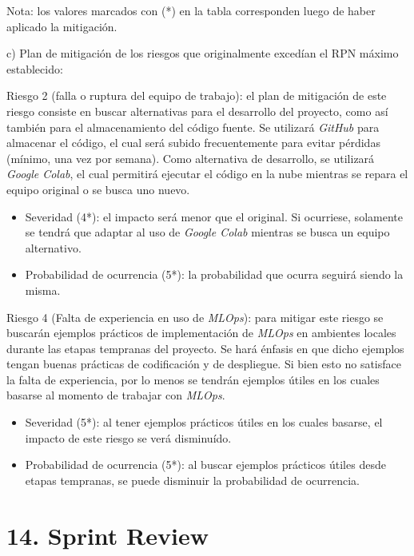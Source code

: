 \documentclass[
11pt, %
]{charter}
\begin{document}
Nota: los valores marcados con (*) en la tabla corresponden luego de haber aplicado la mitigación.

c) Plan de mitigación de los riesgos que originalmente excedían el RPN máximo establecido:
 
Riesgo 2 (falla o ruptura del equipo de trabajo):
el plan de mitigación de este riesgo consiste en buscar alternativas para el desarrollo del proyecto, como así también para el almacenamiento del código fuente. Se utilizará \textit{GitHub} para almacenar el código, el cual será subido frecuentemente para evitar pérdidas (mínimo, una vez por semana). Como alternativa de desarrollo, se utilizará \textit{Google Colab}, el cual permitirá ejecutar el código en la nube mientras se repara el equipo original o se busca uno nuevo.
\begin{itemize}
	\item Severidad (4*): el impacto será menor que el original. Si ocurriese, solamente se tendrá que adaptar al uso de \textit{Google Colab} mientras se busca un equipo alternativo.
	\item Probabilidad de ocurrencia (5*): la probabilidad que ocurra seguirá siendo la misma.
\end{itemize}

Riesgo 4 (Falta de experiencia en uso de \textit{MLOps}):
para mitigar este riesgo se buscarán ejemplos prácticos de implementación de \textit{MLOps} en ambientes locales durante las etapas tempranas del proyecto. Se hará énfasis en que dicho ejemplos tengan buenas prácticas de codificación y de despliegue. Si bien esto no satisface la falta de experiencia, por lo menos se tendrán ejemplos útiles en los cuales basarse al momento de trabajar con \textit{MLOps}.
\begin{itemize}
    \item Severidad (5*): al tener ejemplos prácticos útiles en los cuales basarse, el impacto de este riesgo se verá disminuído.
    \item Probabilidad de ocurrencia (5*): al buscar ejemplos prácticos útiles desde etapas tempranas, se puede disminuir la probabilidad de ocurrencia.
\end{itemize}
 
\section{14. Sprint Review}
\label{sec:sprint_review}

\end{document}
